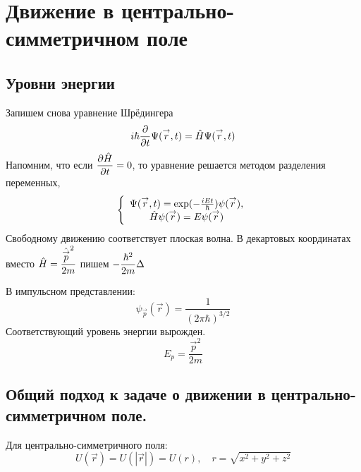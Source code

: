 \setcounter{chapter}{7}
\chapter{Движение в центрально-симметричном поле}
\section{Уровни энергии}
Запишем снова уравнение Шрёдингера
$$
    i \hbar \ud{}{t} \Psi(\vec r, t) = \Hat H \Psi (\vec r, t)
$$
Напомним, что если $\ud{\Hat H}{t} = 0$, то уравнение решается методом разделения переменных,
$$
    \left\{
        \begin{array}{c}
            \Psi(\vec r, t) = \exp (- \frac{i E t}{\hbar}) \psi(\vec r),\\
            \Hat H \psi(\vec r) = E \psi(\vec r)
        \end{array}
    \right.
$$
Свободному движению соответствует плоская волна. 
В декартовых координатах вместо $\Hat H = \dfrac{\Hat{\vec p}^2}{2m}$ пишем $-\dfrac{\hbar^2}{2m} \Dta$

В импульсном представлении:
$$
    \psi_{\vec p} (\vec r) = \dfrac{1}{(2 \pi \hbar)^{3/2}}
$$
Соответствующий уровень энергии вырожден.
$$
    E_{p} = \dfrac{\vec p^2}{2m}
$$

\section{Общий подход к задаче о движении в центрально-симметричном поле.}
Для центрально-симметричного поля:
$$
    U(\vec r) = U(|\vec r|) = U(r), \quad r = \sqrt{x^2 + y^2 + z^2}
$$
